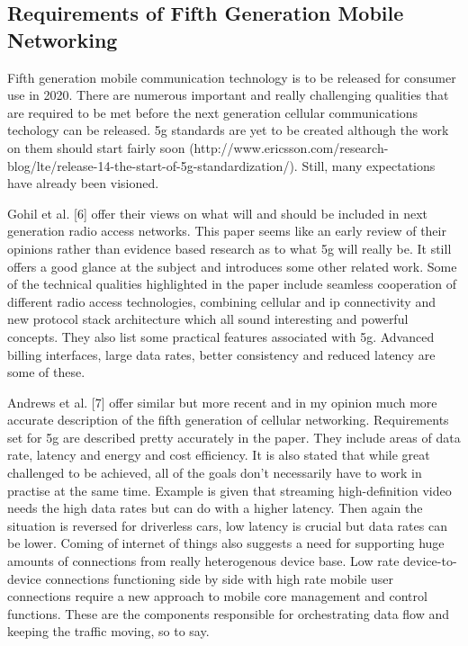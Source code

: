 \documentclass[conference]{IEEEtran}
\begin{document}
\subsection{Requirements of Fifth Generation Mobile Networking}
Fifth generation mobile communication technology is to be released for consumer use in 2020. There are numerous important and really challenging qualities that are required to be met before the next generation cellular communications techology can be released. 5g standards are yet to be created although the work on them should start fairly soon (http://www.ericsson.com/research-blog/lte/release-14-the-start-of-5g-standardization/). Still, many expectations have already been visioned.
\par
Gohil et al. [6] offer their views on what will and should be included in next generation radio access networks. This paper seems like an early review of their opinions rather than evidence based research as to what 5g will really be. It still offers a good glance at the subject and introduces some other related work. Some of the technical qualities highlighted in the paper include seamless cooperation of different radio access technologies, combining cellular and ip connectivity and new protocol stack architecture which all sound interesting and powerful concepts. They also list some practical features associated with 5g. Advanced billing interfaces, large data rates, better consistency and reduced latency are some of these.
\par
Andrews et al. [7] offer similar but more recent and in my opinion much more accurate description of the fifth generation of cellular networking. Requirements set for 5g are described pretty accurately in the paper. They include areas of data rate, latency and energy and cost efficiency. It is also stated that while great challenged to be achieved, all of the goals don't necessarily have to work in practise at the same time. Example is given that streaming high-definition video needs the high data rates but can do with a higher latency. Then again the situation is reversed for driverless cars, low latency is crucial but data rates can be lower. Coming of internet of things also suggests a need for supporting huge amounts of connections from really heterogenous device base. Low rate device-to-device connections functioning side by side with high rate mobile user connections require a new approach to mobile core management and control functions. These are the components responsible for orchestrating data flow and keeping the traffic moving, so to say.
\end{document}

